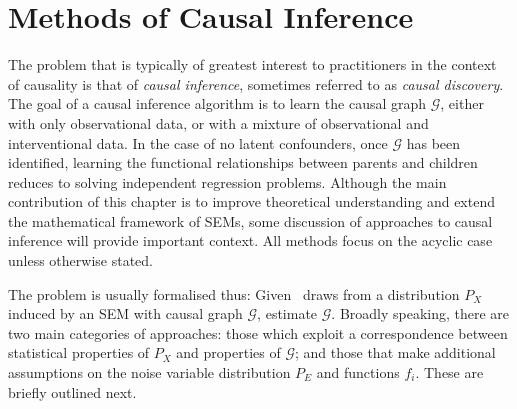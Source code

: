 \section{Methods of Causal Inference}\label{section:causality-causal-inference}
The problem that is typically of greatest interest to practitioners in the context of causality is that of \emph{causal inference}, sometimes referred to as \emph{causal discovery}.
The goal of a causal inference algorithm is to learn the causal graph $\mathcal{G}$, 
either with only observational data, or with a mixture of observational and interventional data.
In the case of no latent confounders, once $\mathcal{G}$ has been identified, learning the functional relationships between parents and children reduces to solving independent regression problems. 
Although the main contribution of this chapter is to improve theoretical understanding and extend the mathematical framework of SEMs, some discussion of approaches to causal inference will provide important context.
All methods focus on the acyclic case unless otherwise stated.


The problem is usually formalised thus: Given \iid~draws from a distribution $P_X$ induced by an SEM with causal graph $\mathcal{G}$, estimate $\mathcal{G}$.
Broadly speaking, there are two main categories of approaches: those which exploit a correspondence between statistical properties of $P_X$ and properties of $\mathcal{G}$; and those that make additional assumptions on the noise variable distribution $P_E$ and functions $f_i$.
These are briefly outlined next.

